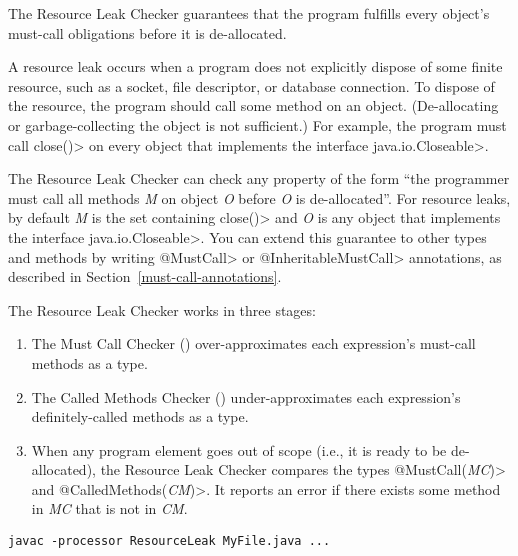 \htmlhr
{}

The Resource Leak Checker guarantees that the program fulfills every object's
must-call obligations before it is de-allocated.

A resource leak occurs when a program does not explicitly dispose of some finite
resource, such as a socket, file descriptor, or database connection.  To dispose
of the resource, the program should call some method on an object.
(De-allocating or garbage-collecting the object is not sufficient.)  For
example, the program must call \<close()> on every object that implements the
interface \<java.io.Closeable>.

The Resource Leak Checker can check any property of the form ``the programmer
must call all methods \emph{M} on object \emph{O} before \emph{O} is
de-allocated''.  For resource leaks, by default \emph{M} is the set containing
\<close()> and \emph{O} is any object that implements the interface
\<java.io.Closeable>.  You can extend this guarantee to other types and methods
by writing \<@MustCall> or \<@InheritableMustCall> annotations, as described in
Section~\ref{must-call-annotations}.

The Resource Leak Checker works in three stages:
\begin{enumerate}
\item The Must Call Checker ()
  over-approximates each expression's must-call methods as a
   type.
\item The Called Methods Checker ()
  under-approximates each expression's definitely-called methods as a
   type.
\item When any program element goes out of scope (i.e., it is ready to be
  de-allocated), the Resource Leak Checker compares the types
  \<@MustCall(\emph{MC})> and \<@CalledMethods(\emph{CM})>.  It reports an error
  if there exists some method in \emph{MC} that is not in \emph{CM}.
\end{enumerate}



\begin{Verbatim}
javac -processor ResourceLeak MyFile.java ...
\end{Verbatim}

